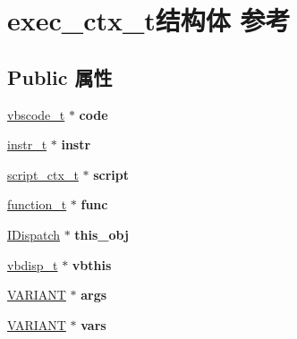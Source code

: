 \hypertarget{structexec__ctx__t}{}\section{exec\+\_\+ctx\+\_\+t结构体 参考}
\label{structexec__ctx__t}
\subsection*{Public 属性}
\begin{DoxyCompactItemize}
\item 
\mbox{\label{structexec__ctx__t_a5b958dfaa37af9c6d73e499f0b215128}} 
\hyperlink{struct__vbscode__t}{vbscode\+\_\+t} $\ast$ {\bfseries code}
\item 
\mbox{\label{structexec__ctx__t_afce2741d19a2564cf6d6aa76ffeecaa9}} 
\hyperlink{structinstr__t}{instr\+\_\+t} $\ast$ {\bfseries instr}
\item 
\mbox{\label{structexec__ctx__t_a1f95f33b593bd325d7df9e09159b54da}} 
\hyperlink{struct__script__ctx__t}{script\+\_\+ctx\+\_\+t} $\ast$ {\bfseries script}
\item 
\mbox{\label{structexec__ctx__t_a12978fbab7c5e1ad12805535e66b371a}} 
\hyperlink{struct__function__t}{function\+\_\+t} $\ast$ {\bfseries func}
\item 
\mbox{\label{structexec__ctx__t_afcfd53e932fe117c475ffad8ab06fc2a}} 
\hyperlink{interface_i_dispatch}{I\+Dispatch} $\ast$ {\bfseries this\+\_\+obj}
\item 
\mbox{\label{structexec__ctx__t_a55771191840fbb39d6790d0d0897537a}} 
\hyperlink{struct__vbdisp__t}{vbdisp\+\_\+t} $\ast$ {\bfseries vbthis}
\item 
\mbox{\label{structexec__ctx__t_a0ec38fe03c398daba6d00da41b11cb46}} 
\hyperlink{structtag_v_a_r_i_a_n_t}{V\+A\+R\+I\+A\+NT} $\ast$ {\bfseries args}
\item 
\mbox{\label{structexec__ctx__t_ad14b51500eb2fb19a0627f0de96ee78e}} 
\hyperlink{structtag_v_a_r_i_a_n_t}{V\+A\+R\+I\+A\+NT} $\ast$ {\bfseries vars}

\end{DoxyCompactItemize}
